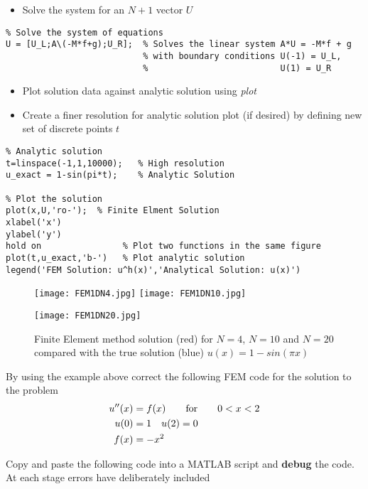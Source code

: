 \documentclass[12pt]{report}
\begin{document}
\begin{itemize}
\item Solve the system for an $N+1$ vector $U$
\end{itemize}
\begin{lstlisting}
% Solve the system of equations
U = [U_L;A\(-M*f+g);U_R];  % Solves the linear system A*U = -M*f + g 
                           % with boundary conditions U(-1) = U_L, 
                           %                          U(1) = U_R
\end{lstlisting}

\begin{itemize}
\item Plot solution data against analytic solution using \textit{plot}
\item Create a finer resolution for analytic solution plot (if desired) by defining new set of discrete points $t$
\end{itemize}

\begin{lstlisting}
% Analytic solution 
t=linspace(-1,1,10000);   % High resolution  
u_exact = 1-sin(pi*t);    % Analytic Solution 

% Plot the solution 
plot(x,U,'ro-');  % Finite Elment Solution 
xlabel('x')
ylabel('y')
hold on                % Plot two functions in the same figure
plot(t,u_exact,'b-')   % Plot analytic solution
legend('FEM Solution: u^h(x)','Analytical Solution: u(x)')
\end{lstlisting}


\begin{figure}[!htb]
  \texttt{[image: FEM1DN4.jpg]}
  \label{fig:awesome_image1}
\endminipage\hfill
{}
  \texttt{[image: FEM1DN10.jpg]}
  \label{fig:awesome_image2}
\endminipage

\centering
\texttt{[image: FEM1DN20.jpg]}
\label{fig:awesome_image3}
\caption{Finite Element method solution (red) for $N=4$, $N=10$ and $N=20$ compared with the true solution (blue) $u(x)=1-sin(\pi{x})$}
\end{figure}

\begin{tcolorbox}[title=Task]
By using the example above correct the following FEM code for the solution to the problem 
\begin{equation}\label{BVPc}
\begin{split}
u''(x)&=f(x)\qquad\textnormal{for}\qquad{0}<x<2\\
u(0)&=1\quad{u}(2)=0\\
f(x)&=-x^2
\end{split}
\end{equation}

Copy and paste the following code into a MATLAB script and \textbf{debug} the code. At each stage errors have deliberately included
\end{tcolorbox}
\newpage
\end{document}
